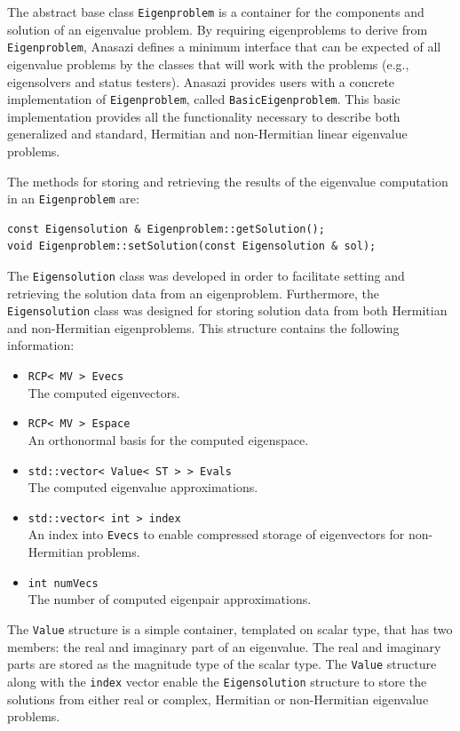 \documentclass[acmtoms]{acmtrans2m}
\newcommand{\aspace}[1]{\texttt{#1}}
\begin{document}
The abstract base class \aspace{Eigenproblem} is a container for the components and
solution of an eigenvalue problem. By requiring eigenproblems to derive from
\aspace{Eigenproblem}, Anasazi defines a minimum interface that can be expected of all
eigenvalue problems by the classes that will work with the problems (e.g., eigensolvers
and status testers). Anasazi provides users with a concrete implementation of
\aspace{Eigenproblem}, called \aspace{BasicEigenproblem}. This basic implementation
provides all the functionality necessary to describe both generalized and standard,
Hermitian and non-Hermitian linear eigenvalue problems.

The methods for storing and retrieving the results of the
eigenvalue computation in an \aspace{Eigenproblem} are:
\begin{verbatim}
const Eigensolution & Eigenproblem::getSolution();
void Eigenproblem::setSolution(const Eigensolution & sol);
\end{verbatim}

The \aspace{Eigensolution} class was developed in order to
facilitate setting and retrieving the solution data from an eigenproblem.  
Furthermore, the \aspace{Eigensolution} class was designed for storing
solution data from both Hermitian and non-Hermitian eigenproblems. 
This structure contains the following information:
\begin{itemize}
  \item \verb!RCP< MV > Evecs! \\
   The computed eigenvectors.
 \item \verb!RCP< MV > Espace! \\
   An orthonormal basis for the computed eigenspace.
 \item \verb!std::vector< Value< ST > > Evals! \\
   The computed eigenvalue approximations.
 \item \verb!std::vector< int > index! \\
   An index into \verb!Evecs! to enable compressed storage of eigenvectors for non-Hermitian problems.
 \item \verb!int numVecs! \\
   The number of computed eigenpair approximations.
\end{itemize}
The \aspace{Value} structure is a simple container, templated on scalar type, that
has two members: the real and imaginary part of an eigenvalue.  The real and imaginary
parts are stored as the magnitude type of the scalar type.  The \aspace{Value} structure
along with the \verb!index! vector enable the \aspace{Eigensolution} structure to 
store the solutions from either real or complex, Hermitian or non-Hermitian eigenvalue
problems.
\end{document}
